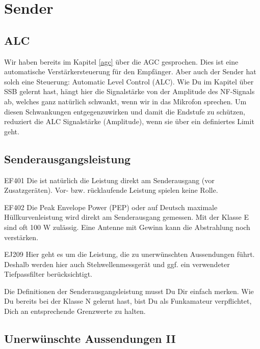 
\setcounter{section}{10}
\section{Sender}
\subsection{ALC}
\begin{ohmchapter}
Wir haben bereits im Kapitel \ref{agc} über die AGC gesprochen. Dies ist eine automatische Verstärkersteuerung für den Empfänger.
Aber auch der Sender hat solch eine Steuerung: Automatic Level Control (ALC). Wie Du im Kapitel über SSB gelernt hast, hängt hier die Signalstärke von der Amplitude des NF-Signals ab, welches ganz natürlich schwankt, wenn wir in das Mikrofon sprechen. 
Um diesen Schwankungen entgegenzuwirken und damit die Endstufe zu schützen, reduziert die ALC Signalstärke (Amplitude), wenn sie über ein definiertes Limit geht.
\end{ohmchapter}  
\subsection{Senderausgangsleistung}

\begin{sol}{EF401}
Die  ist natürlich die Leistung direkt am Senderausgang (vor Zusatzgeräten). Vor- bzw. rücklaufende Leistung spielen keine Rolle.
\end{sol}  
\begin{sol}{EF402}
Die Peak Envelope Power (PEP) oder auf Deutsch maximale Hüllkurvenleistung wird direkt am Senderausgang gemessen.
Mit der Klasse E sind oft 100 W zulässig. Eine Antenne mit Gewinn kann die Abstrahlung noch verstärken.
\end{sol}  

\begin{sol}{EJ209}
Hier geht es um die Leistung, die zu unerwünschten Aussendungen führt. Deshalb werden hier auch Stehwellenmessgerät und ggf. ein verwendeter Tiefpassfilter berücksichtigt.
\end{sol}  


\begin{ohmchapter}
  Die Definitionen der Senderausgangsleistung musst Du Dir einfach merken. Wie Du bereits bei der Klasse N gelernt hast, bist Du als Funkamateur verpflichtet, Dich an entsprechende Grenzwerte zu halten.
\end{ohmchapter}

\subsection{Unerwünschte Aussendungen II}

